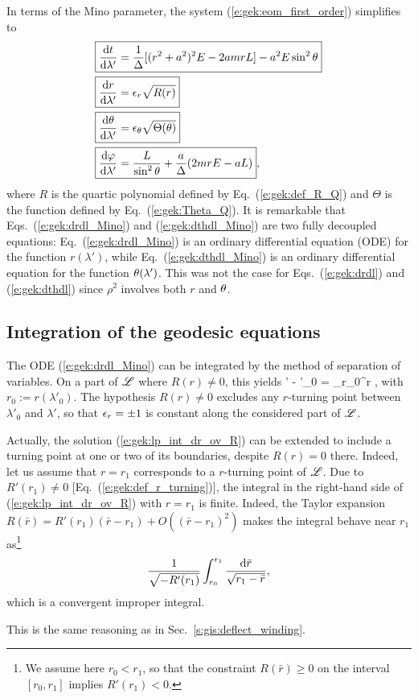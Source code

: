 In terms of the Mino parameter, the system (\ref{e:gek:eom_first_order}) simplifies to
\begin{subequations}
\label{e:gek:eom_Mino}
\begin{align}
& \fbox{$\displaystyle  \frac{\mathrm{d} t}{\mathrm{d} \lambda'} = \frac{1}{\Delta} [(r^2 + a^2)^2 E - 2a m r L] - a^2 E \sin^2\theta $} \label{e:gek:dtdl_Mino} \\
& \fbox{$\displaystyle  \frac{\mathrm{d} r}{\mathrm{d} \lambda'} = \epsilon_r \sqrt{ R(r) } $} \label{e:gek:drdl_Mino}\\
& \fbox{$\displaystyle  \frac{\mathrm{d} \theta}{\mathrm{d} \lambda'} = \epsilon_\theta \sqrt{\Theta(\theta)} $} \label{e:gek:dthdl_Mino}\\
& \fbox{$\displaystyle  \frac{\mathrm{d} \varphi}{\mathrm{d} \lambda'}  = \frac{L}{\sin^2\theta}
    + \frac{a}{\Delta}(2 m r E - a L) $} , \label{e:gek:dphdl_Mino}
\end{align}
\end{subequations}
where $R$ is the quartic polynomial defined by Eq.~(\ref{e:gek:def_R_Q})
and $\Theta$ is the function defined by Eq.~(\ref{e:gek:Theta_Q}).
It is remarkable that Eqs.~(\ref{e:gek:drdl_Mino}) and (\ref{e:gek:dthdl_Mino})
are two fully decoupled equations: Eq.~(\ref{e:gek:drdl_Mino}) is an ordinary
differential equation (ODE) for the function $r(\lambda')$, while Eq.~(\ref{e:gek:dthdl_Mino})
is an ordinary differential equation for the function $\theta(\lambda')$. This was
not the case for Eqs.~(\ref{e:gek:drdl}) and (\ref{e:gek:dthdl}) since $\rho^2$ involves
both $r$ and $\theta$.

\subsection{Integration of the geodesic equations} \label{e:gek:integration}

The ODE (\ref{e:gek:drdl_Mino}) can be integrated by the method of separation
of variables. On a part of $\mathscr{L}$ where $R(r)\neq 0$, this yields
\be \label{e:gek:lp_int_dr_ov_R}
    \lambda' - \lambda'_0 =  \int_{r_0}^r  ,
\ee
with $r_0 := r(\lambda'_0)$.
The hypothesis $R(r)\neq 0$
excludes any $r$-turning point between $\lambda'_0$ and $\lambda'$, so that
$\epsilon_r=\pm 1$ is constant along
the considered part of $\mathscr{L}$.

Actually, the solution (\ref{e:gek:lp_int_dr_ov_R})
can be extended to include a turning point at one or two of its boundaries,
despite $R(r)=0$ there.
Indeed, let us assume that $r=r_1$ corresponds to a $r$-turning point of $\mathscr{L}$.
Due to $R'(r_1)\neq 0$ [Eq.~(\ref{e:gek:def_r_turning})], the
integral in the right-hand side of (\ref{e:gek:lp_int_dr_ov_R}) with $r=r_1$
is finite. Indeed,
the Taylor expansion $R(\bar{r}) = R'(r_1) (\bar{r} - r_1) + O((\bar{r} - r_1)^2)$
makes the integral behave near $r_1$
as\footnote{We assume here $r_0<r_1$, so that the constraint
$R(\bar{r})\geq 0$ on the interval $[r_0,r_1]$ implies $R'(r_1)<0$.}
\[
    \frac{1}{\sqrt{-R'(r_1)}} \int_{r_0}^{r_1} \frac{\mathrm{d} \bar{r}}{\sqrt{r_1 - \bar{r}}} ,
\]
which is a convergent improper integral.
\begin{remark}
This is the same reasoning as in Sec.~\ref{s:gis:deflect_winding}.
\end{remark}

